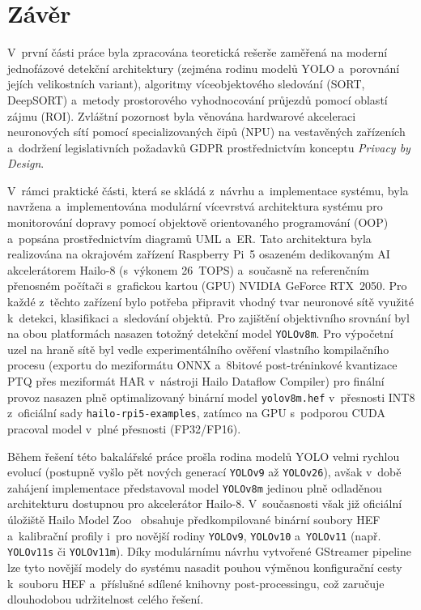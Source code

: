 \chapter{Závěr} 

V~první části práce byla zpracována teoretická rešerše zaměřená na moderní jednofázové detekční architektury (zejména rodinu modelů \acs{YOLO} a~porovnání jejích velikostních variant), algoritmy víceobjektového sledování (\acs{SORT}, \acs{DeepSORT}) a~metody prostorového vyhodnocování průjezdů pomocí oblastí zájmu (\acs{ROI}). Zvláštní pozornost byla věnována hardwarové akceleraci neuronových sítí pomocí specializovaných čipů (\acs{NPU}) na vestavěných zařízeních a~dodržení legislativních požadavků \acs{GDPR} prostřednictvím konceptu \textit{Privacy by Design}.

V~rámci praktické části, která se skládá z~návrhu a~implementace systému, byla navržena a~implementována modulární vícevrstvá architektura systému pro monitorování dopravy pomocí objektově orientovaného programování (\acs{OOP}) a~popsána prostřednictvím diagramů \acs{UML} a~\acs{ER}. Tato architektura byla realizována na okrajovém zařízení Raspberry Pi~5 osazeném dedikovaným AI akcelerátorem Hailo-8 (s~výkonem 26~\acs{TOPS}) a~současně na referenčním přenosném počítači s~grafickou kartou (\acs{GPU}) NVIDIA GeForce RTX~2050. Pro každé z~těchto zařízení bylo potřeba připravit vhodný tvar neuronové sítě využité k~detekci, klasifikaci a~sledování objektů. Pro zajištění objektivního srovnání byl na obou platformách nasazen totožný detekční model \texttt{YOLOv8m}. Pro výpočetní uzel na hraně sítě byl vedle experimentálního ověření vlastního kompilačního procesu (exportu do meziformátu \acs{ONNX} a~8bitové post-tréninkové kvantizace \acs{PTQ} přes meziformát \acs{HAR} v~nástroji Hailo Dataflow Compiler) pro finální provoz nasazen plně optimalizovaný binární model \texttt{yolov8m.hef} v~přesnosti INT8 z~oficiální sady \texttt{hailo-rpi5-examples}, zatímco na GPU s~podporou CUDA pracoval model v~plné přesnosti (FP32/FP16). 

Během řešení této bakalářské práce prošla rodina modelů YOLO velmi rychlou evolucí (postupně vyšlo pět nových generací \texttt{YOLOv9} až \texttt{YOLOv26}), avšak v~době zahájení implementace představoval model \texttt{YOLOv8m} jedinou plně odladěnou architekturu dostupnou pro akcelerátor Hailo-8. V~současnosti však již oficiální úložiště Hailo Model Zoo~\cite{hailo_model_zoo} obsahuje předkompilované binární soubory \acs{HEF} a~kalibrační profily i~pro novější rodiny \texttt{YOLOv9}, \texttt{YOLOv10} a~\texttt{YOLOv11} (např. \texttt{YOLOv11s} či \texttt{YOLOv11m}). Díky modulárnímu návrhu vytvořené GStreamer pipeline lze tyto novější modely do systému nasadit pouhou výměnou konfigurační cesty k~souboru HEF a~příslušné sdílené knihovny post-processingu, což zaručuje dlouhodobou udržitelnost celého řešení.

